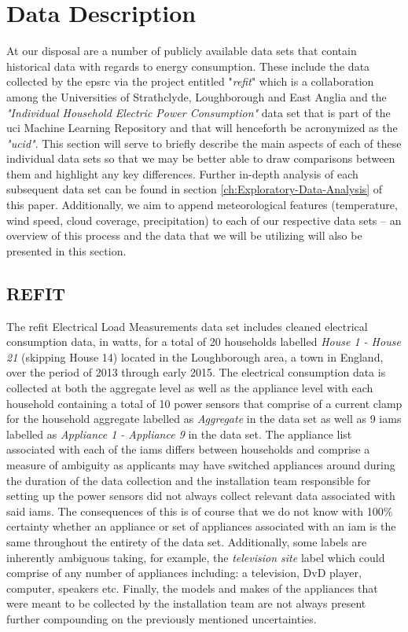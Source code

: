\chapter{Data Description}
\label{ch:Data-Description}
At our disposal are a number of publicly available data sets that contain historical data with regards to energy consumption. These include the data collected by the \gls{epsrc} via the project entitled "\textit{\gls{refit}}" \cite{REFIT} which is a collaboration among the Universities of Strathclyde, Loughborough and East Anglia and the \textit{"Individual Household Electric Power Consumption"} data set \cite{UCID} that is part of the \gls{uci} Machine Learning Repository and that will henceforth be acronymized as the \textit{"\gls{ucid}"}. This section will serve to briefly describe the main aspects of each of these individual data sets so that we may be better able to draw comparisons between them and highlight any key differences. Further in-depth analysis of each subsequent data set can be found in section \ref{ch:Exploratory-Data-Analysis} of this paper. Additionally, we aim to append meteorological features (\eg temperature, wind speed, cloud coverage, precipitation) to each of our respective data sets -- an overview of this process and the data that we will be utilizing will also be presented in this section.

\section{REFIT}
\label{sec:Data-Description:REFIT}
The \gls{refit} Electrical Load Measurements data set includes cleaned electrical consumption data, in watts, for a total of 20 households labelled \textit{House 1 - House 21} (skipping House 14) located in the Loughborough area, a town in England, over the period of 2013 through early 2015. The electrical consumption data is collected at both the aggregate level as well as the appliance level with each household containing a total of 10 power sensors that comprise of a current clamp for the household aggregate labelled as \textit{Aggregate} in the data set as well as 9 \glspl{iam} labelled as \textit{Appliance 1 - Appliance 9} in the data set. The appliance list associated with each of the \glspl{iam} differs between households and comprise a measure of ambiguity as applicants may have switched appliances around during the duration of the data collection and the installation team responsible for setting up the power sensors did not always collect relevant data associated with said \glspl{iam}. The consequences of this is of course that we do not know with 100\% certainty whether an appliance or set of appliances associated with an \gls{iam} is the same throughout the entirety of the data set. Additionally, some labels are inherently ambiguous taking, for example, the \textit{television site} label which could comprise of any number of appliances including: a television, DvD player, computer, speakers etc. Finally, the models and makes of the appliances that were meant to be collected by the installation team are not always present further compounding on the previously mentioned uncertainties.

